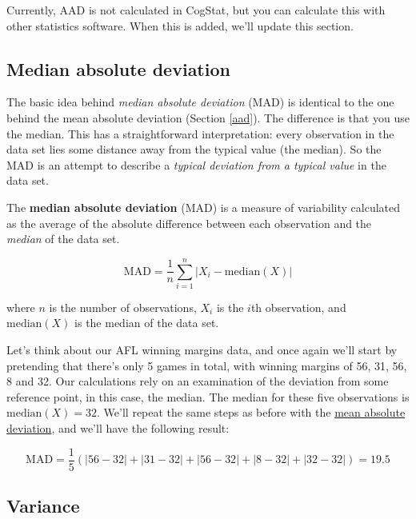 \documentclass[
  11pt,
  a4paper,
  twoside,symmetric,openright]{book}
\theoremstyle{break}
\theoremstyle{break}
\begin{document}
Currently, AAD is not calculated in CogStat, but you can calculate this with other statistics software. When this is added, we'll update this section.

\subsection{Median absolute deviation}\label{mad}

The basic idea behind \emph{median absolute deviation} (MAD) is identical to the one behind the mean absolute deviation (Section \ref{aad}). The difference is that you use the median. This has a straightforward interpretation: every observation in the data set lies some distance away from the typical value (the median). So the MAD is an attempt to describe a \emph{typical deviation from a typical value} in the data set.

\begin{definition}
\protect\hypertarget{def:defMAD}{}\label{def:defMAD}The \textbf{median absolute deviation} (MAD) is a measure of variability calculated as the average of the absolute difference between each observation and the \emph{median} of the data set.

\[
\text{MAD} = \frac{1}{n} \sum_{i=1}^n |X_i - \text{median}(X)|
\]

where \(n\) is the number of observations, \(X_i\) is the \(i\)th observation, and \(\text{median}(X)\) is the median of the data set.
\end{definition}

\begin{example}
\protect\hypertarget{exm:exMAD}{}\label{exm:exMAD}Let's think about our AFL winning margins data, and once again we'll start by pretending that there's only 5 games in total, with winning margins of 56, 31, 56, 8 and 32. Our calculations rely on an examination of the deviation from some reference point, in this case, the median. The median for these five observations is \(\text{median}(X) = 32\). We'll repeat the same steps as before with the \hyperref[exAAD]{mean absolute deviation}, and we'll have the following result:

\[
\text{MAD} = \frac{1}{5} \left( |56 - 32| + |31 - 32| + |56 - 32| + |8 - 32| + |32 - 32| \right) = 19.5
\]
\end{example}

\subsection{Variance}\label{variance}
\end{document}

